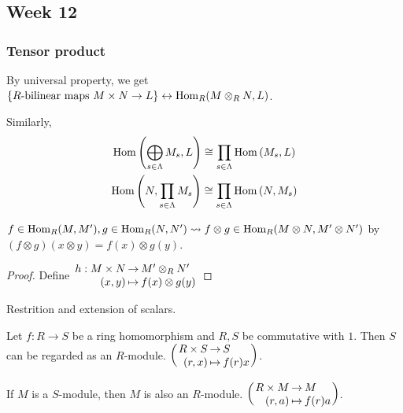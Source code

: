 \subsection{Week 12}
\subsubsection{Tensor product }

By universal property, we get
$\{ R\text{-bilinear maps~} M \times N \to L \} \leftrightarrow
\operatorname{Hom}_R(M \otimes_R N, L)$.

Similarly, 
\begin{gather*}
  \operatorname{Hom}\left(\bigoplus_{s\in \Lambda} M_s, L\right) \cong
  \prod_{s\in \Lambda} \operatorname{Hom}\left(M_s, L\right) \\
  \operatorname{Hom}\left(N, \prod_{s\in \Lambda} M_s\right) \cong
  \prod_{s\in \Lambda} \operatorname{Hom}\left(N, M_s\right) \\
\end{gather*}

\begin{fact}
  $f\in \operatorname{Hom}_R(M, M'), g \in \operatorname{Hom}_R(N, N') \leadsto
  f\otimes g \in \operatorname{Hom}_R(M\otimes N, M'\otimes N')$ by
  $(f \otimes g)(x \otimes y) = f(x) \otimes g(y)$.
  \begin{proof}
    Define
    $\arraycolsep=1pt
    \begin{array}{rcl}
      h: M \times N & \to & M' \otimes_R N' \\
      (x, y) & \mapsto & f(x) \otimes g(y)
    \end{array}$
  \end{proof}
\end{fact}

Restrition and extension of scalars.

Let $f: R \to S$ be a ring homomorphism and $R, S$ be commutative with $1$.
Then $S$ can be regarded as an $R$-module.
    $\arraycolsep=1pt
    \left(\begin{array}{rcl}
      R \times S & \to & S \\
      (r, x) & \mapsto & f(r)x
    \end{array}\right)$.

If $M$ is a $S$-module, then $M$ is also an $R$-module.
    $\arraycolsep=1pt
    \left(\begin{array}{rcl}
      R \times M & \to & M \\
      (r, a) & \mapsto & f(r)a
    \end{array}\right)$.

